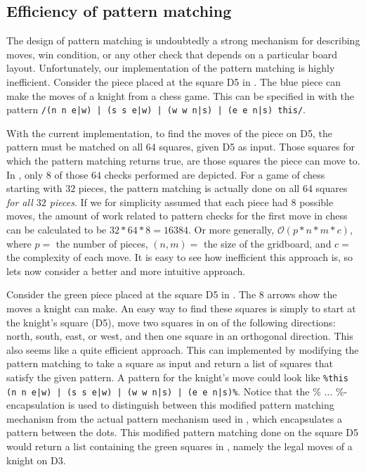 \subsection{Efficiency of pattern matching}
\label{sec:patternmatchingefficiency}
The design of pattern matching is undoubtedly a strong mechanism for
describing moves, win condition, or any other check that depends on
a particular board layout. Unfortunately, our implementation of the
pattern matching is highly inefficient. Consider the piece placed at
the square D5 in . The blue piece can
make the moves of a knight from a chess game. This can be specified in
\productname{} with the pattern \texttt{/(n n e|w) | (s s e|w) | (w w
n|s) | (e e n|s) this/}.


With the current implementation, to find the moves of the piece on D5,
the pattern must be matched on all $64$ squares, given D5 as input.
Those squares for which the pattern matching returns true, are those
squares the piece can move to. In , only
$8$ of those $64$ checks performed are depicted. For a game of chess
starting with $32$ pieces, the pattern matching is actually done on all
$64$ squares \textit{for all $32$ pieces}. If we for simplicity assumed
that each piece had $8$ possible moves, the amount of work related to
pattern checks for the first move in chess can be calculated to be $32
* 64 * 8 = \num{16384}$. Or more generally, $\mathcal{O}(p * n * m *
c)$, where $p = $ the number of pieces, $(n, m) = $ the size of the
gridboard, and $c = $ the complexity of each move. It is easy to see how
inefficient this approach is, so lets now consider a better and more
intuitive approach.

Consider the green piece placed at the square D5 in
. The $8$ arrows show the moves a knight
can make. An easy way to find these squares is simply to start at
the knight's square (D5), move two squares in on of the following directions:
north, south, east, or west,
and then one square in an orthogonal direction. This also seems
like a quite efficient approach. This can implemented by modifying
the pattern matching to take a square as input and return a list of
squares that satisfy the given pattern. A pattern for the knight's move
could look like \texttt{\%this (n n e|w) | (s s e|w) | (w w n|s) | (e
e n|s)\%}. Notice that the \% $\ldots$ \%-encapsulation is used to
distinguish between this modified pattern matching mechanism from the
actual pattern mechanism used in \productname{}, which encapsulates
a pattern between the dots. This modified pattern matching done
on the square D5 would return a list containing the green squares in
, namely the legal moves of a knight on
D3.

